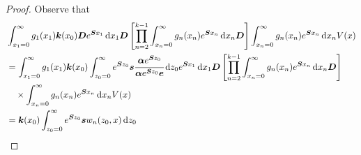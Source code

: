 \begin{proof}
	Observe that 
	\begin{align}
		\nonumber&\int_{x_1=0}^\infty g_1(x_1) \boldsymbol k(x_0) \boldsymbol D e^{\boldsymbol{S}x_1}\, \mathrm{d} x_1\boldsymbol D 
            	\left[\prod_{n=2}^{k-1}\int_{x_n=0}^\infty g_n(x_n) e^{\boldsymbol{S}x_n} \, \mathrm{d} x_n
		\boldsymbol D\right]
            	\int_{x_n=0}^\infty g_{n}(x_n) e^{\boldsymbol{S}x_n} \, \mathrm{d} x_n V(x) 
		\\\nonumber&=\int_{x_1=0}^\infty g_1(x_1) \boldsymbol k(x_0) \int_{z_0=0}^\infty e^{\boldsymbol Sz_0}\boldsymbol s\cfrac{\boldsymbol\alpha e^{\boldsymbol Sz_0}}{\boldsymbol\alpha e^{\boldsymbol Sz_0}\boldsymbol e} \, \mathrm{d} z_0 e^{\boldsymbol{S}x_1}\, \mathrm{d} x_1\boldsymbol D 
            	\left[\prod_{n=2}^{k-1}\int_{x_n=0}^\infty g_n(x_n) e^{\boldsymbol{S}x_n} \, \mathrm{d} x_n
		\boldsymbol D\right]
            	\\\nonumber&\quad\times\int_{x_n=0}^\infty g_{n}(x_n) e^{\boldsymbol{S}x_n} \, \mathrm{d} x_n V(x) 
		\\&=\boldsymbol k(x_0) \int_{z_0=0}^\infty e^{\boldsymbol Sz_0}\boldsymbol sw_n(z_0,x)\, \mathrm{d} z_0
	\end{align}
	

\end{proof}
